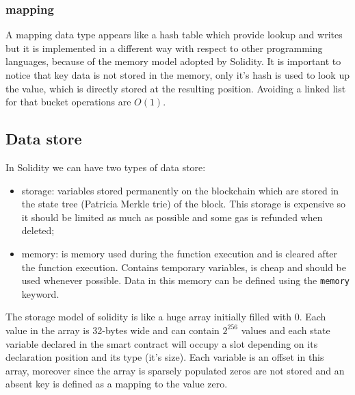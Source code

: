 \subsubsection{mapping}
A mapping data type appears like a hash table which provide lookup and writes but it is implemented in a different way with respect to other programming languages, because of the memory model adopted by Solidity.
It is important to notice that key data is not stored in the memory, only it's hash is used to look up the value, which is directly stored at the resulting position.
Avoiding a linked list for that bucket operations are $O(1)$.

\subsection{Data store}
In Solidity we can have two types of data store:
\begin{itemize}
    \item storage: variables stored permanently on the blockchain which are stored in the state tree (Patricia Merkle trie) of the block.
    This storage is expensive so it should be limited as much as possible and some gas is refunded when deleted;

    \item memory: is memory used during the function execution and is cleared after the function execution.
    Contains temporary variables, is cheap and should be used whenever possible.
    Data in this memory can be defined using the \verb|memory| keyword.    
\end{itemize}

The storage model of solidity is like a huge array initially filled with 0.
Each value in the array is 32-bytes wide and can contain $2^{256}$ values and each state variable declared in the smart contract will occupy a slot depending on its declaration position and its type (it's size).
Each variable is an offset in this array, moreover since the array is sparsely populated zeros are not stored and an absent key is defined as a mapping to the value zero.

